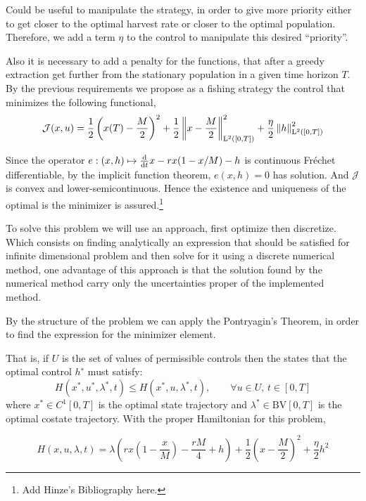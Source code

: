 Could be useful to manipulate the strategy, in order to give more priority either to get closer to the optimal harvest rate or closer to the optimal population. Therefore, we add a term $\eta$ to the control to manipulate this desired ``priority''. 

Also it is necessary to add a penalty for the functions, that after a greedy extraction get further from the stationary population in a given time horizon $T$. By the previous requirements we propose as a fishing strategy the control that minimizes the following  functional,
\begin{equation}
\mathcal{J}(x,u)=\frac{1}{2} \left(x(T)-\frac{M}{2}\right)^2+\frac{1}{2}\left\lVert x-\frac{M}{2} \right\rVert^2_{\mathrm{L}^2([0,T])}+\frac{\eta}{2}\left\lVert h \right\rVert^2_{\mathrm{L}^2([0,T])}
\end{equation}

Since the operator $e:(x,h)\mapsto\frac{\mathrm{d} }{{\mathrm{d} t}}x-rx(1-x/M)-h$ is continuous Fr\'echet differentiable, by the implicit function theorem, $e(x,h)=0$ has solution. And $\mathcal{J}$ is convex and lower-semicontinuous. Hence the existence and uniqueness of the optimal is the minimizer is assured.\footnote{Add Hinze's Bibliography here.}

To solve this problem we will use an approach, first optimize then discretize. Which consists on finding analytically an expression that should be satisfied for infinite dimensional problem and then solve for it using a discrete numerical method, one advantage of this approach is that the solution found by the numerical method carry only the uncertainties proper of the implemented method. 


By the structure of the problem we can apply the Pontryagin's Theorem, in order to find the expression for the minimizer element.

That is, if $U$ is the set of values of permissible controls then the states that the optimal control $h^∗$ must satisfy:
\begin{equation}
H\left( x^*, u^*, \lambda^*, t \right) \leq H(x^*,u, \lambda^*, t), \qquad \forall u \in U,\, t \in [0, T]	\label{eq: HamiltonianOptimalCondition.}
\end{equation}	
where $x^* \in C^1[0, T]$ is the optimal state trajectory and $\lambda^* \in \mathrm{BV}[0, T]$ is the optimal costate trajectory. With the proper Hamiltonian for this problem,

\begin{equation}
H\left( x, u, \lambda, t \right)=\lambda\left(	rx\left(1-\frac{x}{M}\right)-\frac{rM}{4}+h\right)+\frac{1}{2}\left(x-\frac{M}{2}\right)^2+\frac{\eta}{2}h^2
\end{equation}

